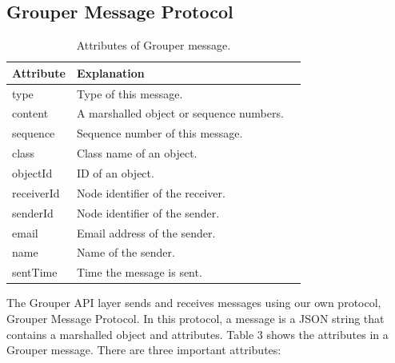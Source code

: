 \documentclass[twocolumn,10pt]{article}
\begin{document}
\subsection{Grouper Message Protocol}

\begin{table}[t]
	\centering
	\caption{Attributes of Grouper message.}
	\label{my-label}
	\begin{tabular}{lll}
		\hline
		\textbf{Attribute} & \textbf{Explanation} \\ \hline
		type & Type of this message. \\
		content & A marshalled object or sequence numbers. \\
		sequence & Sequence number of this message. \\
		class & Class name of an object. \\
		objectId & ID of an object. \\
		receiverId & Node identifier of the receiver. \\
		senderId & Node identifier of the sender. \\
		email & Email address of the sender. \\
		name & Name of the sender. \\
		sentTime & Time the message is sent. \\
		\hline
	\end{tabular}
\end{table}

The Grouper API layer sends and receives messages using our own protocol, Grouper Message Protocol.
In this protocol, a message is a JSON string that contains a marshalled object and attributes.
Table 3 shows the attributes in a Grouper message.
There are three important attributes:
\end{document}
